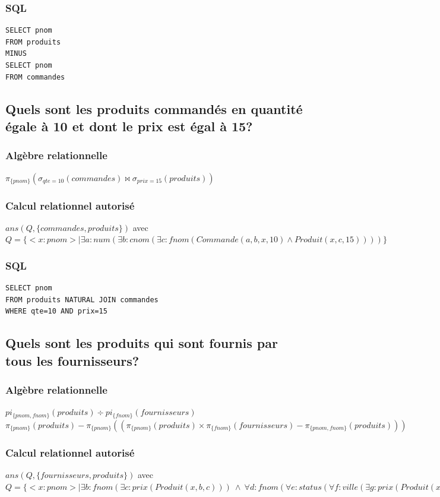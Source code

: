 \documentclass[10pt,a4paper,twoside]{article}
\begin{document}
\subsubsection{SQL}
\begin{verbatim}
SELECT pnom
FROM produits
MINUS
SELECT pnom
FROM commandes
\end{verbatim}

\subsection{Quels sont les produits commandés en quantité égale à 10 et dont le prix est égal à 15?}
\subsubsection{Algèbre relationnelle}
$\pi_{\{pnom\}}(\sigma_{qte=10}(commandes) \bowtie \sigma_{prix=15}(produits))$
\subsubsection{Calcul relationnel autorisé}
$ans(Q,\{commandes, produits\})$ avec $Q=\{<x:pnom> \mid \exists a:num(\exists b:cnom(\exists c:fnom(Commande(a,b,x,10) \wedge Produit(x,c,15)))) \}$
\subsubsection{SQL}
\begin{verbatim}
SELECT pnom
FROM produits NATURAL JOIN commandes
WHERE qte=10 AND prix=15
\end{verbatim}

\subsection{Quels sont les produits qui sont fournis par tous les fournisseurs?}
\subsubsection{Algèbre relationnelle}
$pi_{\{pnom,fnom\}}(produits) \div pi_{\{fnom\}}(fournisseurs) $\\
$\pi_{\{pnom\}}(produits) - \pi_{\{pnom\}}((\pi_{\{pnom\}}(produits) \times \pi_{\{fnom\}}(fournisseurs) - \pi_{\{pnom,fnom\}}(produits)))$
\subsubsection{Calcul relationnel autorisé}
$ans(Q,\{fournisseurs, produits\})$ avec $Q=\{<x:pnom> \mid \exists b:fnom(\exists c:prix(Produit(x,b,c)))\ \wedge\ \forall d:fnom(\forall e:status(\forall f:ville(\exists g:prix(Produit(x,d,g)) \vee \neg Fournisseur(d,e,f)))) \}$
\end{document}
